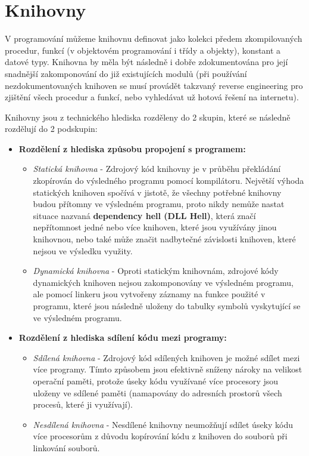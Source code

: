 \chapter{Knihovny}
V programování můžeme knihovnu definovat jako kolekci předem zkompilovaných procedur, funkcí (v objektovém programování i třídy a objekty), konstant a datové typy. Knihovna by měla být následně i dobře zdokumentována pro její snadnější zakomponování do již existujících modulů (při používání nezdokumentovaných knihoven se musí provádět takzvaný reverse engineering pro zjištění všech procedur a funkcí, nebo vyhledávat už hotová řešení na internetu). 
\par
Knihovny jsou z technického hlediska rozděleny do 2 skupin, které se následně rozdělují do 2 podskupin:
	\begin{itemize}
	\item \textbf{Rozdělení z hlediska způsobu propojení s programem:}
		\begin{itemize}
		\item \textit{Statická knihovna} - Zdrojový kód knihovny je v průběhu překládání zkopírován do výsledného programu pomocí kompilátoru. Největší výhoda statických knihoven spočívá v jistotě, že všechny potřebné knihovny budou přítomny ve výsledném programu, proto nikdy nemůže nastat situace nazvaná \textbf{dependency hell (DLL Hell)}, která značí nepřítomnost jedné nebo více knihoven, které jsou využívány jinou knihovnou, nebo také může značit nadbytečné závislosti knihoven, které nejsou ve výsledku využity.
		\item \textit{Dynamická knihovna} - Oproti statickým knihovnám, zdrojové kódy dynamických knihoven nejsou zakomponovány ve výsledném programu, ale pomocí linkeru jsou vytvořeny záznamy na funkce použité v programu, které jsou následně uloženy do tabulky symbolů vyskytující se ve výsledném programu.
		\end{itemize}
	\item \textbf{Rozdělení z hlediska sdílení kódu mezi programy:}
		\begin{itemize}
		\item \textit{Sdílená knihovna} - Zdrojový kód sdílených knihoven je možné sdílet mezi více programy. Tímto způsobem jsou efektivně sníženy nároky na velikost operační paměti, protože úseky kódu využívané více procesory jsou uloženy ve sdílené paměti (namapovány do adresních prostorů všech procesů, které ji využívají).
		\item \textit{Nesdílená knihovna} - Nesdílené knihovny neumožňují sdílet úseky kódu více procesorům z důvodu kopírování kódu z knihoven do souborů při linkování souborů.
		\end{itemize}
	\end{itemize}
